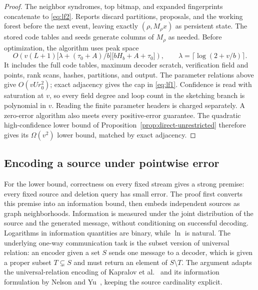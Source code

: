 \documentclass[11pt,letterpaper]{article}
\numberwithin{equation}{section}
\begin{document}
\begin{proof}
The neighbor syndromes, top bitmap, and expanded fingerprints concatenate to \eqref{eq:lf2}.
Reports discard partitions, proposals, and the working forest before the next event, leaving exactly $(\rho,M_\rho x)$ as persistent state.
The stored code tables and seeds generate columns of $M_\rho$ as needed.
Before optimization, the algorithm uses peak space
\begin{equation}
O\left(v(L+1)\bigl[\lambda+(\tau_0+A)/b\bigr]
                 \bigl[bH_b+A+\tau_0\bigr]\right),\qquad
 \lambda=\lceil\log(2+v/b)\rceil. \label{eq:lf7}
\end{equation}
It includes the full code tables, maximum decoder scratch, verification field and points, rank scans, hashes, partitions, and output.
The parameter relations above give $O(vUr_0^2)$; exact adjacency gives the cap in \eqref{eq:lf1}.
Confidence is read with saturation at $v$, so every field degree and loop count in the sketching branch is polynomial in $v$.
Reading the finite parameter headers is charged separately.
A zero-error algorithm also meets every positive-error guarantee.
The quadratic high-confidence lower bound of Proposition~\ref{prop:direct-unrestricted} therefore gives its $\Omega(v^2)$ lower bound, matched by exact adjacency.
\end{proof}



\subsection{Encoding a source under pointwise error}
\label{sec:pointwise-source}

For the lower bound, correctness on every fixed stream gives a strong premise: every fixed source and deletion query has small error.
The proof first converts this premise into an information bound, then embeds independent sources as graph neighborhoods.
Information is measured under the joint distribution of the source and the generated message, without conditioning on successful decoding.
Logarithms in information quantities are binary, while $\ln$ is natural.
The underlying one-way communication task is the subset version of universal relation: an encoder given a set $S$ sends one message to a decoder, which is given a proper subset $T\subsetneq S$ and must return an element of $S\setminus T$.
The argument adapts the universal-relation encoding of Kapralov et al.~\cite[Section~3.1]{KNPWWY2017} and its information formulation by Nelson and Yu~\cite[Appendix~B]{NelsonYu2019}, keeping the source cardinality explicit.
\end{document}
